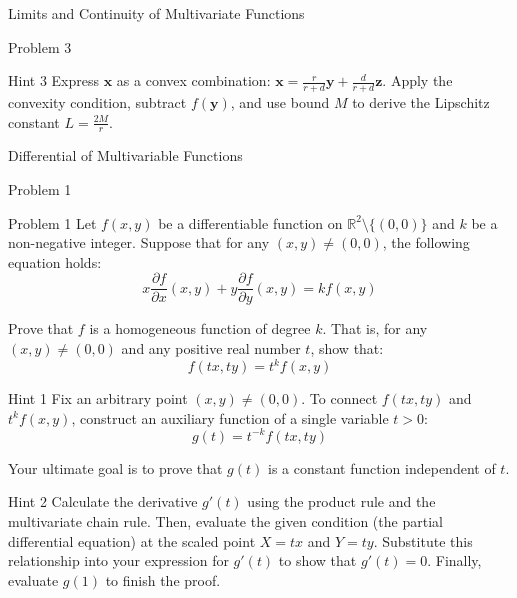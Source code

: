 \documentclass{beamer}
\begin{document}
\begin{section}{Limits and Continuity of Multivariate Functions}
\begin{subsection}{Problem 3}
\begin{frame}
        \pause
        \vspace{2em}
        \begin{block}{Hint 3}
            Express $\mathbf{x}$ as a convex combination: $\mathbf{x} = \frac{r}{r+d}\mathbf{y} + \frac{d}{r+d}\mathbf{z}$. Apply the convexity condition, subtract $f(\mathbf{y})$, and use bound $M$ to derive the Lipschitz constant $L = \frac{2M}{r}$.    
        \end{block}
    \end{frame}
\end{subsection}

\end{section}

\begin{section}{Differential of Multivariable Functions}

\begin{subsection}{Problem 1}
    \begin{frame}
        \begin{block}{Problem 1}
            Let $f(x,y)$ be a differentiable function on $\mathbb{R}^2 \setminus \{(0,0)\}$ and $k$ be a non-negative integer. Suppose that for any $(x,y) \neq (0,0)$, the following equation holds:
            $$
            x \frac{\partial f}{\partial x}(x,y) + y \frac{\partial f}{\partial y}(x,y) = k f(x,y)
            $$
            
            Prove that $f$ is a homogeneous function of degree $k$. That is, for any $(x,y) \neq (0,0)$ and any positive real number $t$, show that:
            $$
            f(tx, ty) = t^k f(x,y)
            $$
        \end{block}
    \end{frame}

    \begin{frame}
        \begin{block}{Hint 1}
            Fix an arbitrary point $(x,y) \neq (0,0)$. To connect $f(tx, ty)$ and $t^k f(x,y)$, construct an auxiliary function of a single variable $t > 0$:
            $$
            g(t) = t^{-k} f(tx, ty)
            $$
        
            Your ultimate goal is to prove that $g(t)$ is a constant function independent of $t$.
        \end{block}

        \pause
        \vspace{1em}
        \begin{block}{Hint 2}
            Calculate the derivative $g'(t)$ using the product rule and the multivariate chain rule. Then, evaluate the given condition (the partial differential equation) at the scaled point $X = tx$ and $Y = ty$. Substitute this relationship into your expression for $g'(t)$ to show that $g'(t) = 0$. Finally, evaluate $g(1)$ to finish the proof.    
        \end{block}
    \end{frame}
\end{subsection}



\end{section}
\end{document}
